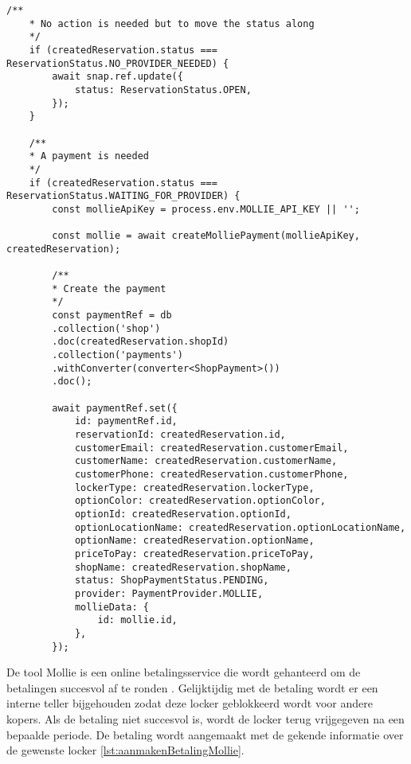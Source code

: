 \begin{lstlisting}[caption={Valideert of er een betaling van toepassing is. Indien nodig creëert het een betaling en bewaard deze in de databank}, label={lst:aanmakenBetaling}]
    /**
    * No action is needed but to move the status along
    */
    if (createdReservation.status === ReservationStatus.NO_PROVIDER_NEEDED) {
        await snap.ref.update({
            status: ReservationStatus.OPEN,
        });
    }
    
    /**
    * A payment is needed
    */
    if (createdReservation.status === ReservationStatus.WAITING_FOR_PROVIDER) {
        const mollieApiKey = process.env.MOLLIE_API_KEY || '';
        
        const mollie = await createMolliePayment(mollieApiKey, createdReservation);
        
        /**
        * Create the payment
        */
        const paymentRef = db
        .collection('shop')
        .doc(createdReservation.shopId)
        .collection('payments')
        .withConverter(converter<ShopPayment>())
        .doc();
        
        await paymentRef.set({
            id: paymentRef.id,
            reservationId: createdReservation.id,
            customerEmail: createdReservation.customerEmail,
            customerName: createdReservation.customerName,
            customerPhone: createdReservation.customerPhone,
            lockerType: createdReservation.lockerType,
            optionColor: createdReservation.optionColor,
            optionId: createdReservation.optionId,
            optionLocationName: createdReservation.optionLocationName,
            optionName: createdReservation.optionName,
            priceToPay: createdReservation.priceToPay,
            shopName: createdReservation.shopName,
            status: ShopPaymentStatus.PENDING,
            provider: PaymentProvider.MOLLIE,
            mollieData: {
                id: mollie.id,
            },
        });
\end{lstlisting}

De tool Mollie is een online betalingsservice die wordt gehanteerd om de betalingen succesvol af te ronden \autocite{docs2023}. Gelijktijdig met de betaling wordt er een interne teller bijgehouden zodat deze locker geblokkeerd wordt voor andere kopers. Als de betaling niet succesvol is, wordt de locker terug vrijgegeven na een bepaalde periode. De betaling wordt aangemaakt met de gekende informatie over de gewenste locker \ref{lst:aanmakenBetalingMollie}.

